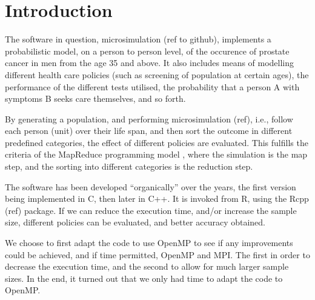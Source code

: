 \section{Introduction}

The software in question, microsimulation (ref to github), implements
a probabilistic model, on a person to person level, of the occurence
of prostate cancer in men from the age 35 and above. It also includes
means of modelling different health care policies (such as screening
of population at certain ages), the performance of the different tests
utilised, the probability that a person A with symptoms B seeks care
themselves, and so forth.

By generating a population, and performing microsimulation (ref),
i.e., follow each person (unit) over their life span, and then sort
the outcome in different predefined categories, the effect of
different policies are evaluated. This fulfills the criteria of the
MapReduce programming model \cite{MapReduce:2004}, where the
simulation is the map step, and the sorting into different categories
is the reduction step.

The software has been developed ``organically'' over the years, the
first version being implemented in C, then later in C++. It is invoked
from R, using the Rcpp (ref) package. If we can reduce the execution
time, and/or increase the sample size, different policies can be
evaluated, and better accuracy obtained.

We choose to first adapt the code to use OpenMP to see if any
improvements could be achieved, and if time permitted, OpenMP and
MPI. The first in order to decrease the execution time, and the second
to allow for much larger sample sizes. In the end, it turned out that
we only had time to adapt the code to OpenMP.







